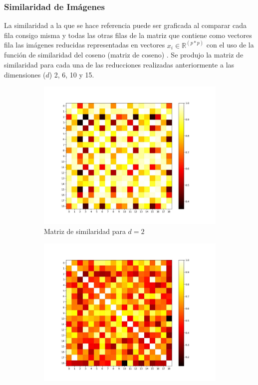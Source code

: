 \documentclass[12pt,a4]{article} %
\begin{document}
\subsubsection{Similaridad de Imágenes}
La similaridad a la que se hace referencia puede ser graficada al comparar cada fila consigo misma y todas las otras filas de la matriz que contiene como vectores fila las imágenes reducidas representadas en vectores $x_i \in \mathbb{R}^{(p*p)}$ con el uso de la función de similaridad del coseno (matriz de coseno) \cite{wikipedia_cosine_similarity}. Se produjo la matriz de similaridad para cada una de las reducciones realizadas anteriormente a las dimensiones ($d$) 2, 6, 10 y 15.

\begin{figure}[H]
    \centering
    \begin{subfigure}{0.45\textwidth}
        \includegraphics[width=\linewidth]{latex_project/Graficos_ej2/similarity_matrix_2.jpeg}
        \caption{Matriz de similaridad para $d = 2$}
        \label{fig:similarity_d2}
    \end{subfigure}
    \hfill
    \begin{subfigure}{0.45\textwidth}
        \includegraphics[width=\linewidth]{latex_project/Graficos_ej2/similarity_matrix_6.jpeg}

\end{subfigure}
\end{figure}
\end{document}
